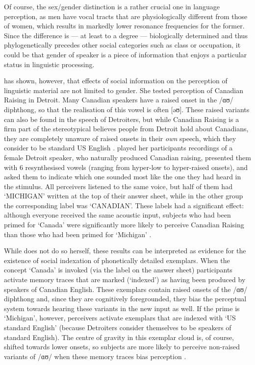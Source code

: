 Of course, the sex/gender distinction is a rather crucial one in language perception, as men have vocal tracts that are physiologically different from those of women, which results in markedly lower resonance frequencies for the former.
Since the difference is --- at least to a degree --- biologically determined and thus phylogenetically precedes other social categories such as class or occupation, it could be that gender of speaker is a piece of information that enjoys a particular status in linguistic processing.

\textcite{niedzielski1999} has shown, however, that effects of social information on the perception of linguistic material are not limited to gender.
She tested perception of Canadian Raising in Detroit.
Many Canadian speakers have a raised onset in the /ɑʊ/ diphthong, so that the realisation of this vowel is often [əʊ].
These raised variants can also be found in the speech of Detroiters, but while Canadian Raising is a firm part of the stereotypical believes people from Detroit hold about Canadians, they are completely unaware of raised onsets in their \emph{own} speech, which they consider to be standard US English \parencite[cf.][63]{niedzielski1999}.
\citeauthor{niedzielski1999} played her participants recordings of a female Detroit speaker, who naturally produced Canadian raising, presented them with 6 resynthesised vowels (ranging from hyper-low to hyper-raised onsets), and asked them to indicate which one sounded most like the one they had heard in the stimulus.
All perceivers listened to the same voice, but half of them had `MICHIGAN' written at the top of their answer sheet, while in the other group the corresponding label was `CANADIAN'.
These labels had a significant effect: although everyone received the same acoustic input, subjects who had been primed for `Canada' were significantly more likely to perceive Canadian Raising than those who had been primed for `Michigan' \parencite[cf.][64--68]{niedzielski1999}.

While \citeauthor{niedzielski1999} does not do so herself, these results can be interpreted as evidence for the existence of social indexation of phonetically detailed exemplars.
When the concept `Canada' is invoked (via the label on the answer sheet) participants activate memory traces that are marked (`indexed') as having been produced by speakers of Canadian English.
These exemplars contain raised onsets of the /ɑʊ/ diphthong and, since they are cognitively foregrounded, they bias the perceptual system towards hearing these variants in the new input as well.
If the prime is `Michigan', however, perceivers activate exemplars that are indexed with `US standard English' (because Detroiters consider themselves to be speakers of standard English).
The centre of gravity in this exemplar cloud is, of course, shifted towards lower onsets, so subjects are more likely to perceive non-raised variants of /ɑʊ/ when these memory traces bias perception \parencite[cf.][372]{hayetal2006a}.


